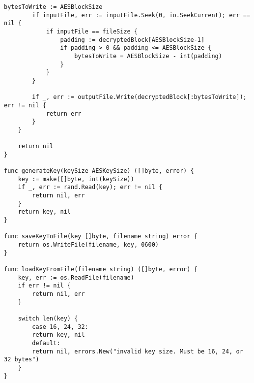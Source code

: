 \begin{lstlisting}[style=golang, caption={Реализация алгоритма симметричного шифрования (AЕS)}, label=lst:codegolang]
		bytesToWrite := AESBlockSize
		if inputFile, err := inputFile.Seek(0, io.SeekCurrent); err == nil {
			if inputFile == fileSize {
				padding := decryptedBlock[AESBlockSize-1]
				if padding > 0 && padding <= AESBlockSize {
					bytesToWrite = AESBlockSize - int(padding)
				}
			}
		}
		
		if _, err := outputFile.Write(decryptedBlock[:bytesToWrite]); err != nil {
			return err
		}
	}
	
	return nil
}

func generateKey(keySize AESKeySize) ([]byte, error) {
	key := make([]byte, int(keySize))
	if _, err := rand.Read(key); err != nil {
		return nil, err
	}
	return key, nil
}

func saveKeyToFile(key []byte, filename string) error {
	return os.WriteFile(filename, key, 0600)
}

func loadKeyFromFile(filename string) ([]byte, error) {
	key, err := os.ReadFile(filename)
	if err != nil {
		return nil, err
	}
	
	switch len(key) {
		case 16, 24, 32:
		return key, nil
		default:
		return nil, errors.New("invalid key size. Must be 16, 24, or 32 bytes")
	}
}

\end{lstlisting}
